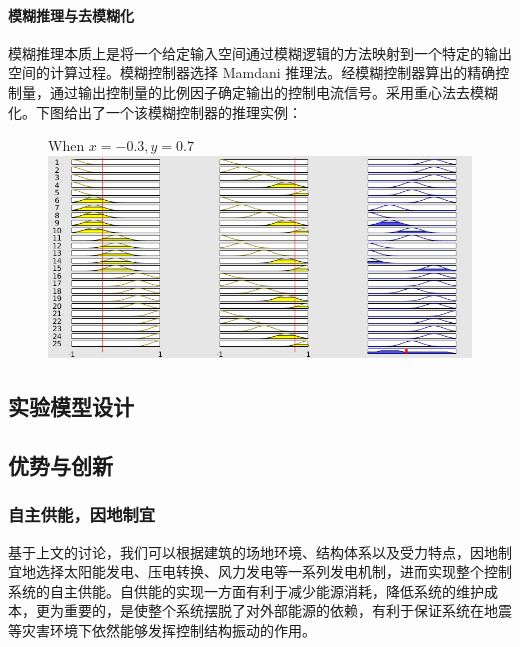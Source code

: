 \paragraph{模糊推理与去模糊化}
\qquad 模糊推理本质上是将一个给定输入空间通过模糊逻辑的方法映射到一个特定的输出空间的计算过程。模糊控制器选择 Mamdani 推理法。经模糊控制器算出的精确控制量，通过输出控制量的比例因子确定输出的控制电流信号。采用重心法去模糊化。下图给出了一个该模糊控制器的推理实例：

\begin{figure}[H]
\centering
{}
{When $x=-0.3,y=0.7$}
\includegraphics[width=0.5\linewidth]{figure/fuzzyeg}
\end{figure}


%

\subsection{实验模型设计}

\subsection{优势与创新}

\subsubsection{自主供能，因地制宜}
基于上文的讨论，我们可以根据建筑的场地环境、结构体系以及受力特点，因地制宜地选择太阳能发电、压电转换、风力发电等一系列发电机制，进而实现整个控制系统的自主供能。自供能的实现一方面有利于减少能源消耗，降低系统的维护成本，更为重要的，是使整个系统摆脱了对外部能源的依赖，有利于保证系统在地震等灾害环境下依然能够发挥控制结构振动的作用。

